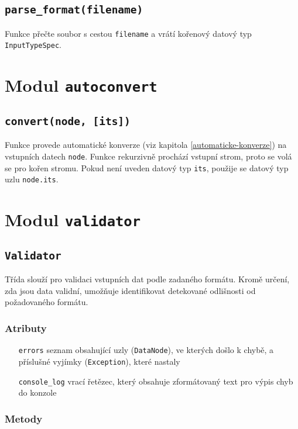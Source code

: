 \documentclass[FM,MP]{tulthesis}
\begin{document}
		\subsection*{\texttt{parse\_format(filename)}}
			Funkce přečte soubor s cestou \texttt{filename} a vrátí kořenový datový typ \texttt{InputTypeSpec}.

	\section{Modul \texttt{autoconvert}}
		\subsection*{\texttt{convert(node, [its])}}
			Funkce provede automatické konverze (viz kapitola \ref{automaticke-konverze}) na vstupních datech \texttt{node}. Funkce rekurzivně prochází vstupní strom, proto se volá se pro kořen stromu. Pokud není uveden datový typ \texttt{its}, použije se datový typ uzlu \texttt{node.its}.


	\section{Modul \texttt{validator}}
		\subsection*{\texttt{Validator}}
			Třída slouží pro validaci vstupních dat podle zadaného formátu. Kromě určení, zda jsou data validní, umožňuje identifikovat detekované odlišnosti od požadovaného formátu.

			\subsubsection{Atributy}
				\begin{itemize}[leftmargin=3cm]
					\setlength\itemsep{-2mm}
					\item[\texttt{errors}] seznam obsahující uzly (\texttt{DataNode}), ve kterých došlo k chybě, a příslušné vyjímky (\texttt{Exception}), které nastaly
					\item[\texttt{console\_log}] vrací řetězec, který obsahuje zformátovaný text pro výpis chyb do konzole
				\end{itemize}
			
			\subsubsection{Metody}
\end{document}
